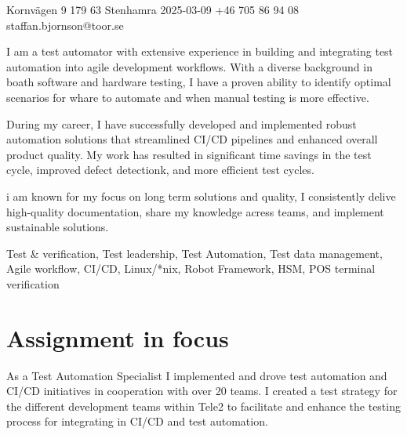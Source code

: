 \documentclass{sobCV}[2015/09/08]
\begin{document}
       {Kornvägen 9}
       {179 63 Stenhamra}
       {2025-03-09}
       {+46 705 86 94 08} 
       {staffan.bjornson@toor.se}






   {
       I am a test automator with extensive experience in building and
       integrating test automation into agile development workflows. With a
       diverse background in boath software and hardware testing, I have a
       proven ability to identify optimal scenarios for whare to automate and
       when manual testing is more effective. 

       During my career, I have successfully developed and implemented robust
       automation solutions that streamlined CI/CD pipelines and enhanced
       overall product quality. My work has resulted in significant time
       savings in the test cycle, improved defect detectionk, and more
       efficient test cycles.

       i am known for my focus on long term solutions and quality, I
       consistently delive high-quality documentation, share my knowledge
       acress teams, and implement sustainable solutions.
   }{
       Test \& verification,
       Test leadership,
       Test Automation, 
       Test data management,
       Agile workflow,
       CI/CD,
       Linux/*nix,
       Robot Framework,
       HSM,
       POS terminal verification
    }


\section{Assignment in focus}
    As a Test Automation Specialist I implemented and drove test automation and
    CI/CD initiatives in cooperation with over 20 teams. I created a test
    strategy for the different development teams within Tele2 to facilitate and
    enhance the testing process for integrating in CI/CD and test automation.
\end{document}
